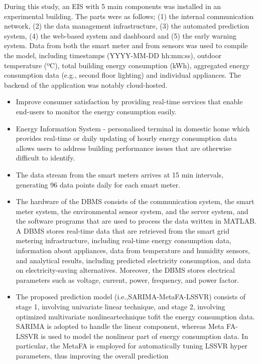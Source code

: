 \documentclass[11pt,]{article}
\providecommand{\tightlist}{%
  \setlength{\itemsep}{0pt}\setlength{\parskip}{0pt}}
\begin{document}
During this study, an EIS with 5 main components was installed in an
experimental building. The parts were as follows; (1) the internal
communication network, (2) the data management infrastructure, (3) the
automated prediction system, (4) the web-based system and dashboard and
(5) the early warning system. Data from both the smart meter and from
sensors was used to compile the model, including timestamps (YYYY-MM-DD
hh:mm:ss), outdoor temperature (ºC), total building energy consumption
(kWh), aggregated energy consumption data (e.g., second floor lighting)
and individual appliances. The backend of the application was notably
cloud-hosted.

\begin{itemize}
\tightlist
\item
  Improve consumer satisfaction by providing real-time services that
  enable end-users to monitor the energy consumption easily.
\item
  Energy Information System - personalised terminal in domestic home
  which provides real-time or daily updating of hourly energy
  consumption data allows users to address building performance issues
  that are otherwise difficult to identify.
\item
  The data stream from the smart meters arrives at 15 min intervals,
  generating 96 data points daily for each smart meter.
\item
  The hardware of the DBMS consists of the communication system, the
  smart meter system, the environmental sensor system, and the server
  system, and the software programs that are used to process the data
  written in MATLAB. A DBMS stores real-time data that are retrieved
  from the smart grid metering infrastructure, including real-time
  energy consumption data, information about appliances, data from
  temperature and humidity sensors, and analytical results, including
  predicted electricity consumption, and data on electricity-saving
  alternatives. Moreover, the DBMS stores electrical parameters such as
  voltage, current, power, frequency, and power factor.
\item
  The proposed prediction model (i.e.,SARIMA-MetaFA-LSSVR) consists of
  stage 1, involving univariate linear technique, and stage 2, involving
  optimized multivariate nonlineartechnique tofit the energy consumption
  data. SARIMA is adopted to handle the linear component, whereas Meta
  FA-LSSVR is used to model the nonlinear part of energy consumption
  data. In particular, the MetaFA is employed for automatically tuning
  LSSVR hyper parameters, thus improving the overall prediction

\end{itemize}
\end{document}
